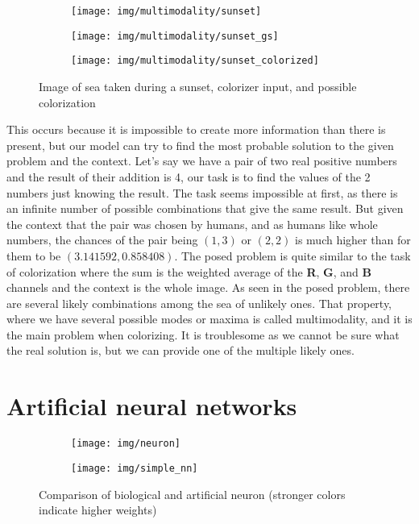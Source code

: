 \begin{figure}
	\centering
	\begin{subfigure}{.32\textwidth}
		\centering
		\texttt{[image: img/multimodality/sunset]}
	\end{subfigure}
	\begin{subfigure}{.32\textwidth}
		\centering
		\texttt{[image: img/multimodality/sunset\_gs]}
	\end{subfigure}
    \begin{subfigure}{.32\textwidth}
		\centering
		\texttt{[image: img/multimodality/sunset\_colorized]}
	\end{subfigure}
    \caption{Image of sea taken during a sunset, colorizer input, and possible colorization}
	\label{fig:multimodality_sunset}
\end{figure}

This occurs because it is impossible to create more information than there is present, 
but our model can try to find the most probable solution to the given problem and the context. 
Let's say we have a pair of two real positive numbers and the result of their 
addition is 4, our task is to find the values of the 2 numbers just knowing the 
result. The task seems impossible at first, as there is an infinite number of possible 
combinations that give the same result. But given the context that the pair was 
chosen by humans, and as humans like whole numbers, the chances of the pair being
$(1, 3)$ or $(2, 2)$ is much higher than for them to be $(3.141592, 0.858408)$. The posed
problem is quite similar to the task of colorization where the sum is the weighted 
average of the \textbf{R}, \textbf{G}, and \textbf{B} channels and the context is the 
whole image. As seen in the posed problem, there are several likely combinations
among the sea of unlikely ones. That property, where we have several possible modes 
or maxima is called multimodality, and it is the main problem when colorizing. It is
troublesome as we cannot be sure what the real solution is, but we can provide one 
of the multiple likely ones.

\section{Artificial neural networks}

\begin{figure}
	\centering
	\begin{subfigure}{.49\textwidth}
		\centering
		\texttt{[image: img/neuron]}
	\end{subfigure}
	\begin{subfigure}{.49\textwidth}
		\centering
		\texttt{[image: img/simple\_nn]}
	\end{subfigure}
    \caption{Comparison of biological and artificial neuron (stronger colors indicate higher weights)}
	\label{fig:neuron}
\end{figure}

